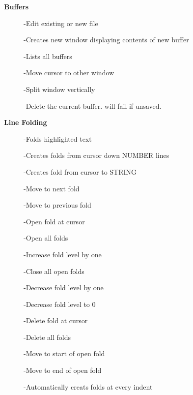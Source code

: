 \documentclass{article}
\begin{document}
\begin{multicols}{3}
\columnbreak
\begin{center}
\Large\textbf{Buffers}
\end{center}
\begin{description}
\item[]
-Edit existing or new file
\item[]
-Creates new window displaying contents of new buffer
\item[]
-Lists all buffers
\item[]
-Move cursor to other window
\item[]
-Split window vertically
\item[]
-Delete the current buffer. will fail if unsaved.
\end{description}
\end{multicols}


\begin{center}
\Large\textbf{Line Folding}
\end{center}

\begin{multicols}{3}
\begin{description}
\item[] 
-Folds highlighted text
\item[]
-Creates folds from cursor down NUMBER lines
\item[]
-Creates fold from cursor to STRING
\item[] 
-Move to next fold
\item[]
-Move to previous fold
\item[]
-Open fold at cursor
\item[]
-Open all folds
\item[]
-Increase fold level by one
\item[]
-Close all open folds
\item[]
-Decrease fold level by one
\item[]
-Decrease fold level to 0
\item[] 
-Delete fold at cursor
\item[]
-Delete all folds
\item[\ttfamily{\texttt{[}z}]
-Move to start of open fold
\item[\ttfamily{\texttt{]}z}]
-Move to end of open fold
\item[]
-Automatically creats folds at every indent
\end{description}



\end{multicols}
\end{document}
